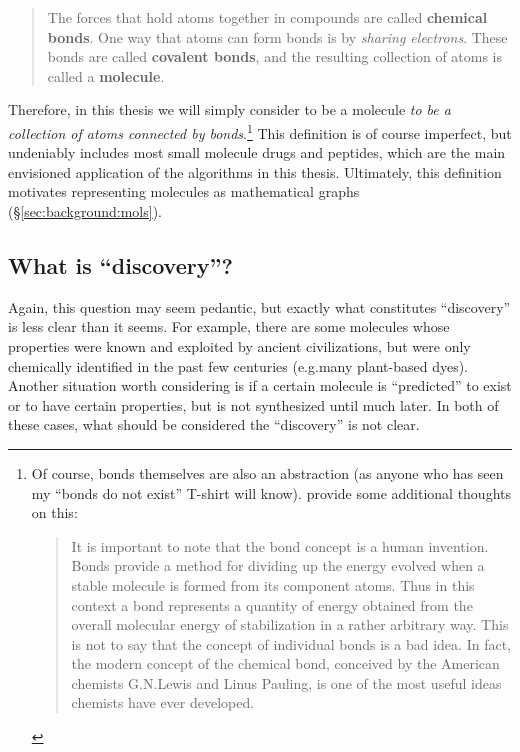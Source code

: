 \begin{quotation}
    The forces that hold atoms together in compounds are called \textbf{chemical bonds}.
    One way that atoms can form bonds is by \textit{sharing electrons}.
    These bonds are called \textbf{covalent bonds}, and the resulting collection of atoms is called a \textbf{molecule}.
\end{quotation}

Therefore, in this thesis we will simply consider to be a molecule
\emph{to be a collection of atoms connected by bonds}.\footnote{
    Of course, bonds themselves are also an abstraction (as anyone who has seen my ``bonds do not exist'' T-shirt will know).
    \citet[page 348]{zumdahl2006chemistry} provide some additional thoughts on this:
    \begin{quotation}
        It is important to note that the bond concept is a human invention.
        Bonds provide a method for dividing up the energy evolved when a stable molecule is formed from its component atoms.
        Thus in this context a bond represents a quantity of energy obtained from the overall molecular energy of stabilization
        in a rather arbitrary way. This is not to say that the concept of individual bonds is a bad idea.
        In fact, the modern concept of the chemical bond, conceived by the American chemists G.\@ N.\@ Lewis
        and Linus Pauling, is one of the most useful ideas chemists have ever developed.
    \end{quotation}
}
This definition is of course imperfect,
but undeniably includes most small molecule drugs and peptides,
which are the main envisioned application of the algorithms in this thesis.
Ultimately, this definition motivates representing molecules as mathematical graphs (\S\ref{sec:background:mols}).

\subsection{What is ``discovery''?}
\label{sec:intro:what is discovery}

Again, this question may seem pedantic,
but exactly what constitutes ``discovery'' is less clear than it seems.
For example, there are some molecules whose properties were known and exploited by ancient civilizations,
but were only chemically identified in the past few centuries (e.g.\@ many plant-based dyes).
Another situation worth considering is if a certain molecule is ``predicted'' to exist or to have certain properties,
but is not synthesized until much later.
In both of these cases, what should be considered the ``discovery'' is not clear.

